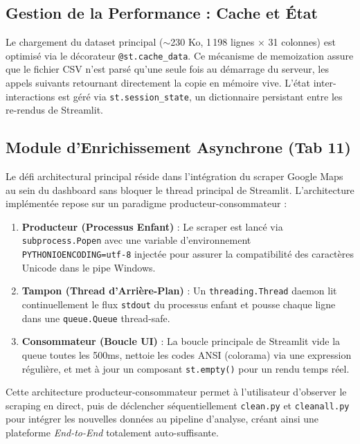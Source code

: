\subsection{Gestion de la Performance : Cache et État}

Le chargement du dataset principal ($\sim$230 Ko, 1\,198 lignes $\times$ 31 colonnes) est optimisé via le décorateur \texttt{@st.cache\_data}. Ce mécanisme de memoization assure que le fichier CSV n'est parsé qu'une seule fois au démarrage du serveur, les appels suivants retournant directement la copie en mémoire vive. L'état inter-interactions est géré via \texttt{st.session\_state}, un dictionnaire persistant entre les re-rendus de Streamlit.

\subsection{Module d'Enrichissement Asynchrone (Tab 11)}

Le défi architectural principal réside dans l'intégration du scraper Google Maps au sein du dashboard sans bloquer le thread principal de Streamlit. L'architecture implémentée repose sur un paradigme producteur-consommateur :

\begin{enumerate}
    \item \textbf{Producteur (Processus Enfant)} : Le scraper est lancé via \texttt{subprocess.Popen} avec une variable d'environnement \texttt{PYTHONIOENCODING=utf-8} injectée pour assurer la compatibilité des caractères Unicode dans le pipe Windows.
    \item \textbf{Tampon (Thread d'Arrière-Plan)} : Un \texttt{threading.Thread} daemon lit continuellement le flux \texttt{stdout} du processus enfant et pousse chaque ligne dans une \texttt{queue.Queue} thread-safe.
    \item \textbf{Consommateur (Boucle UI)} : La boucle principale de Streamlit vide la queue toutes les 500ms, nettoie les codes ANSI (colorama) via une expression régulière, et met à jour un composant \texttt{st.empty()} pour un rendu temps réel.
\end{enumerate}

Cette architecture producteur-consommateur permet à l'utilisateur d'observer le scraping en direct, puis de déclencher séquentiellement \texttt{clean.py} et \texttt{cleanall.py} pour intégrer les nouvelles données au pipeline d'analyse, créant ainsi une plateforme \textit{End-to-End} totalement auto-suffisante.
